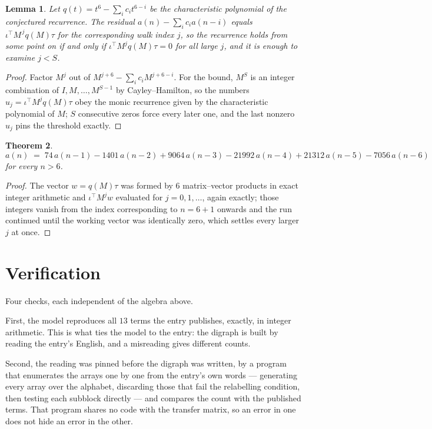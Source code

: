 \documentclass[11pt,a4paper]{article}
\theoremstyle{plain}
\newtheorem{theorem}{Theorem}
\newtheorem{lemma}[theorem]{Lemma}
\theoremstyle{definition}
\begin{document}
\begin{lemma}\label{lem:crit}
Let $q(t)=t^{6}-\sum_i c_it^{6-i}$ be the characteristic polynomial of the
conjectured recurrence. The residual $a(n)-\sum_ic_ia(n-i)$ equals
$\iota^{\!\top}M^{\,j}q(M)\tau$ for the corresponding walk index $j$, so the recurrence
holds from some point on if and only if $\iota^{\!\top}M^{j}q(M)\tau=0$ for all large $j$,
and it is enough to examine $j<S$.
\end{lemma}

\begin{proof}
Factor $M^{j}$ out of $M^{j+6}-\sum_ic_iM^{j+6-i}$. For the bound, $M^{S}$
is an integer combination of $I,M,\dots,M^{S-1}$ by Cayley--Hamilton, so the numbers
$u_j=\iota^{\!\top}M^{j}q(M)\tau$ obey the monic recurrence given by the characteristic
polynomial of $M$; $S$ consecutive zeros force every later one, and the last nonzero $u_j$
pins the threshold exactly.
\end{proof}

\begin{theorem}
\[
a(n)\;=\;74\,a(n-1) - 1401\,a(n-2) + 9064\,a(n-3) - 21992\,a(n-4) + 21312\,a(n-5) - 7056\,a(n-6)
\]
for every $n>6$.
\end{theorem}

\begin{proof}
The vector $w=q(M)\tau$ was formed by $6$ matrix--vector products in exact integer
arithmetic and $\iota^{\!\top}M^{j}w$ evaluated for $j=0,1,\dots$, again exactly; those
integers vanish from the index corresponding to $n=6+1$ onwards and the run continued
until the working vector was identically zero, which settles every larger $j$ at once.
\end{proof}

\section{Verification}

Four checks, each independent of the algebra above.

First, the model reproduces all $13$ terms the entry publishes, exactly, in integer
arithmetic. This is what ties the model to the entry: the digraph is built by reading the
entry's English, and a misreading gives different counts.

Second, the reading was pinned before the digraph was written, by a program that enumerates
the arrays one by one from the entry's own words --- generating every array over the
alphabet, discarding those that fail the relabelling condition, then testing each subblock
directly --- and compares the count with the published terms. That program shares no code
with the transfer matrix, so an error in one does not hide an error in the other.
\end{document}
